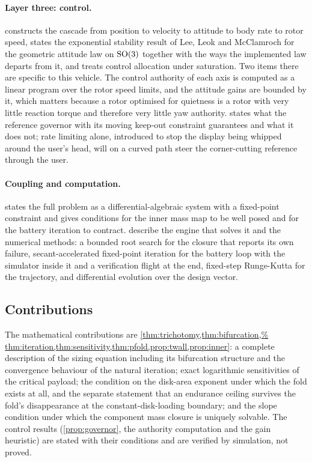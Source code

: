 \paragraph{Layer three: control.}  constructs the cascade
from position to velocity to attitude to body rate to rotor speed, states the
exponential stability result of Lee, Leok and McClamroch for the geometric
attitude law on $\mathrm{SO}(3)$ together with the ways the implemented law departs
from it, and treats control allocation under saturation. Two items there are
specific to this vehicle. The control authority of each axis is computed as a
linear program over the rotor speed limits, and the attitude gains are bounded
by it, which matters because a rotor optimised for quietness is a rotor with
very little reaction torque and therefore very little yaw authority.
 states what the reference governor with its moving
keep-out constraint guarantees and what it does not; rate limiting alone,
introduced to stop the display being whipped around the user's head, will on a
curved path steer the corner-cutting reference through the user.

\paragraph{Coupling and computation.}  states the full
problem as a differential-algebraic system with a fixed-point constraint and
gives conditions for the inner mass map to be well posed and for the battery
iteration to contract.  describe the engine that
solves it and the numerical methods: a bounded root search for the closure
that reports its own failure, secant-accelerated fixed-point iteration for the
battery loop with the simulator inside it and a verification flight at the
end, fixed-step Runge-Kutta for the trajectory, and differential evolution
over the design vector.

\subsection{Contributions}

The mathematical contributions are \cref{thm:trichotomy,thm:bifurcation,%
thm:iteration,thm:sensitivity,thm:pfold,prop:twall,prop:inner}: a complete
description of the sizing equation including its bifurcation structure and the
convergence behaviour of the natural iteration; exact logarithmic sensitivities
of the critical payload; the condition on the disk-area exponent under which
the fold exists at all, and the separate statement that an endurance ceiling
survives the fold's disappearance at the constant-disk-loading boundary; and
the slope condition under which the component mass closure is uniquely
solvable. The control results (\cref{prop:governor}, the authority
computation and the gain heuristic) are stated with their conditions and are
verified by simulation, not proved.

